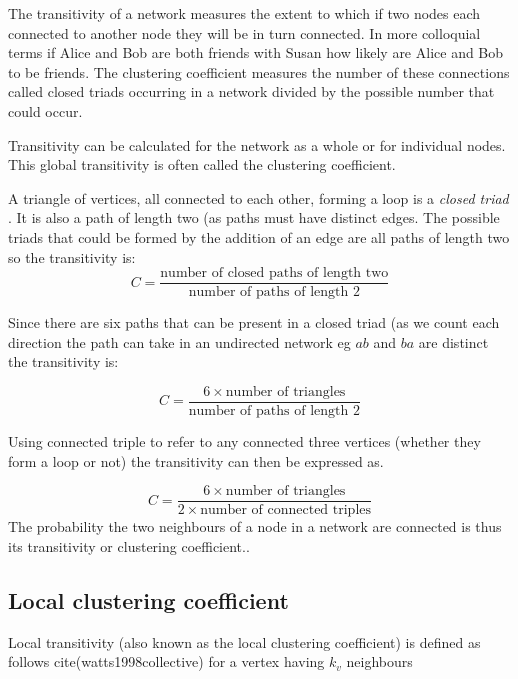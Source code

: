 The transitivity of a network measures the extent to which if two nodes each connected to another node they will be in turn connected. In more colloquial terms if Alice and Bob are both friends with Susan how likely are Alice and Bob to be friends. The clustering coefficient measures the number of these connections called closed triads occurring in a network 
divided by the possible number that could occur.

Transitivity can be calculated for the network as a whole or for individual nodes. This global transitivity is often called the clustering coefficient. 

A triangle of vertices,  all connected to each other, forming a loop is  a \textit{closed triad} \cite{newman2018networks}. It is also a path of length two (as paths must have distinct edges. The possible triads that could be formed by the addition of an edge are all paths of length two so the transitivity is:
\begin{equation}
    C = \frac{\textrm{number of closed paths of length two}}{\textrm{number of paths of length 2}}
\end{equation}

Since there are six paths that can be present in a closed triad (as we count each direction the path can take in an undirected network eg $ab$ and $ba$ are distinct the transitivity is:

\begin{equation}
    C = \frac{6 \times \textrm{number of triangles}}{\textrm{number of paths of length 2}}
\end{equation}

Using connected triple to refer to any connected three vertices (whether they form a loop or not) the transitivity can then be expressed as.

\begin{equation}
    C = \frac{6 \times \textrm{number of triangles}}{2 \times \textrm{number of connected triples}}
\end{equation}
The probability the two neighbours of a node in a network are connected is thus its transitivity or clustering coefficient.\cite{newman2018networks}. 

\subsection{Local clustering coefficient}

Local transitivity (also known as the local clustering coefficient) is defined as  follows cite(watts1998collective) for a vertex having $k_v$ neighbours 

